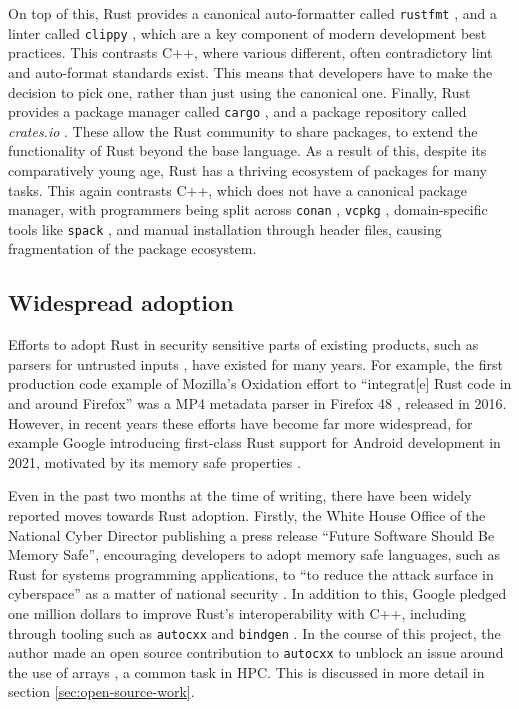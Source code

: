 On top of this, Rust provides a canonical auto-formatter called \texttt{rustfmt} \cite{RustlangRustfmt2024}, and a linter called \texttt{clippy} \cite{RustlangRustclippy2024}, which are a key component of modern development best practices. This contrasts C++, where various different, often contradictory lint and auto-format standards exist. This means that developers have to make the decision to pick one, rather than just using the canonical one. Finally, Rust provides a package manager called \texttt{cargo} \cite{RustlangCargo2024}, and a package repository called \textit{crates.io} \cite{CratesIoRust}. These allow the Rust community to share packages,
to extend the functionality of Rust beyond the base language. As a result of this, despite its comparatively young age, Rust has a thriving ecosystem of packages for many tasks. This again contrasts C++, which does not have a canonical package manager, with programmers being split across \texttt{conan} \cite{ConanioConan2024}, \texttt{vcpkg} \cite{MicrosoftVcpkg2024}, domain-specific tools like \texttt{spack} \cite{gamblin2015spack}, and manual installation through header files, causing fragmentation of the package ecosystem.

\subsection{Widespread adoption}
\label{ssec:rust-adoption}

Efforts to adopt Rust in security sensitive parts of existing products, such as parsers for untrusted inputs \cite{OxidationMozillaWiki}, have existed for many years. For example, the first production code example of Mozilla's Oxidation effort to ``integrat[e] Rust code in and around Firefox'' was a MP4 metadata parser in Firefox 48 \cite{OxidationMozillaWiki}, released in 2016. However, in recent years these efforts have become far more widespread, for example Google introducing first-class Rust support for Android development in 2021, motivated by its memory safe properties \cite{RustAndroidPlatform}.

Even in the past two months at the time of writing, there have been widely reported moves towards Rust adoption. Firstly, the White House Office of the National Cyber Director publishing a press release ``Future Software Should Be Memory Safe'', encouraging developers to adopt memory safe languages, such as Rust for systems programming applications, to ``to reduce the attack surface in cyberspace'' as a matter of national security \cite{PressReleaseFuture2024}. In addition to this, Google pledged one million dollars to improve Rust's interoperability with C++, including through tooling such as \texttt{autocxx} \cite{GoogleAutocxx2024} and \texttt{bindgen} \cite{RustlangRustbindgen2024}. In the course of this project, the author made an open source contribution to \texttt{autocxx} to unblock an issue around the use of arrays \cite{goodmanAddIntegrationTests}, a common task in \acrshort{HPC}. This is discussed in more detail in section \ref{sec:open-source-work}.






